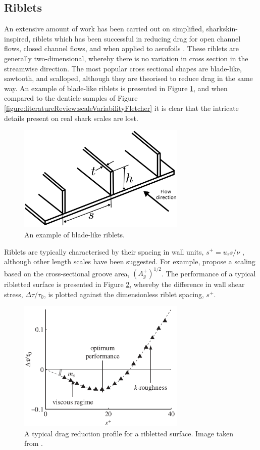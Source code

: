 \documentclass[12pt,oneside,a4paper]{article}
\begin{document}
\subsection{Riblets}
\label{section:literatureReview:Riblets}
An extensive amount of work has been carried out on simplified, sharkskin-inspired, riblets which has been successful in reducing drag for open channel flows, closed channel flows, and when applied to aerofoils \citep{bixler2013review}. These riblets are generally two-dimensional, whereby there is no variation in cross section in the streamwise direction. The most popular cross sectional shapes are blade-like, sawtooth, and scalloped, although they are theorised to reduce drag in the same way. An example of blade-like riblets is presented in Figure \ref{figure:literatureReview:bladeRiblets}, and when compared to the denticle samples of Figure \ref{figure:literatureReview:scaleVariabilityFletcher} it is clear that the intricate details present on real shark scales are lost.
%
\begin{figure}[!b]
\centering
\includegraphics[width=8cm]{images/litReview/bladeRibletsExample.png}
\caption{An example of blade-like riblets.}
\label{figure:literatureReview:bladeRiblets}
\end{figure} 
%
Riblets are typically characterised by their spacing in wall units, $s^+ = u_\tau s / \nu$ \citep{dean2010}, although other length scales have been suggested. For example, \cite{garcia2011a} propose a scaling based on the cross-sectional groove area, $(A_g^+)^{1/2}$. The performance of a typical ribletted surface is presented in Figure \ref{figure:literatureReview:ribletPerformanceRegions}, whereby the difference in wall shear stress, $\Delta \tau / \tau_0$, is plotted against the dimensionless riblet spacing, $s^+$.
%
\begin{figure}[!t]
\centering
\includegraphics[width=8cm]{images/litReview/ribletPerformanceRegions.png}
\caption{A typical drag reduction profile for a ribletted surface. Image taken from \cite{garcia2011}.}
\label{figure:literatureReview:ribletPerformanceRegions}
\end{figure}
\end{document}
